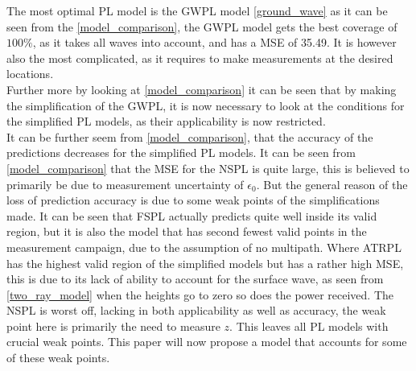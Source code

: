 The most optimal PL model is the GWPL model \eqref{ground_wave} as it can be seen from the  \autoref{model_comparison}, the GWPL model gets the best coverage of $100\%$, as it takes all waves into account, and has a MSE of 35.49. It is however also the most complicated, as it requires to make measurements at the desired locations.\\
Further more by looking at \autoref{model_comparison} it can be seen that by making the simplification of the GWPL, it is now necessary to look at the conditions for the simplified PL models, as their applicability is now restricted.\\
It can be further seem from \autoref{model_comparison}, that the accuracy of the predictions decreases for the simplified PL models.
It can be seen from \autoref{model_comparison} that the MSE for the NSPL is quite large, this is believed to primarily be due to measurement uncertainty of $\epsilon_{0}$.  
But the general reason of the loss of prediction accuracy is due to some weak points of the simplifications made. It can be seen that FSPL actually predicts quite well inside its valid region, but it is also the model that has second fewest valid points in the measurement campaign, due to the assumption of no multipath. Where ATRPL has the highest valid region of the simplified models but has a rather high MSE, this is due to its lack of ability to account for the surface wave, as seen from \eqref{two_ray_model} when the heights go to zero so does the power received. The NSPL is worst off, lacking in both applicability as well as accuracy, the weak point here is primarily the need to measure $z$. This leaves all PL models with crucial weak points. This paper will now propose a model that accounts for some of these weak points. 





